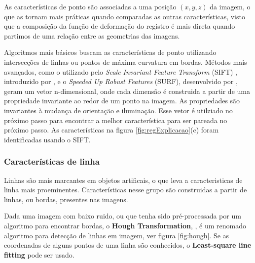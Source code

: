   As características de ponto são associadas a uma posição $(x, y, z)$ da imagem,
o que as tornam mais práticas quando comparadas as outras características,
visto que a composição da função de deformação do registro é mais direta quando
partimos de uma relação entre as geometrias das imagens.

  Algoritmos mais básicos buscam as características de ponto utilizando
intersecções de linhas ou pontos de máxima curvatura em bordas. Métodos mais
avançados, como o utilizado pelo \textit{Scale Invariant Feature Transform}
(SIFT) , introduzido por \cite{lowe2004distinctive}, e o \textit{Speeded Up Robust Features}
(SURF), desenvolvido por \cite{bay2008speeded}, geram um vetor n-dimensional,
onde cada dimensão é construida a partir de uma propriedade invariante ao redor
de um ponto na imagem. As propriedades são invariantes à mudança de
orientação e iluminação. Esse vetor é utilziado no próximo passo para encontrar
a melhor característica para ser pareada no próximo passo. As características
na figura \ref{fig:regExplicacao}(c) foram identificadas usando o SIFT.

\subsubsection{Características de linha}

  Linhas são mais marcantes em objetos artificais, o que leva a caracteristicas
de linha mais proeminentes. Características nesse grupo são construidas a partir
de linhas, ou bordas, presentes nas imagens.

  Dada uma imagem com baixo ruido, ou que tenha sido pré-processada por um algoritmo
para encontrar bordas, o \textbf{Hough Transformation}, \cite{Duda:1972:UHT:361237.361242},
é um renomado algoritmo para detecção de linhas em imagem, ver figura \ref{fig:hough}.
Se as coordenadas de alguns pontos de uma linha são conhecidos, o
\textbf{Least-square line fitting} pode ser usado.

